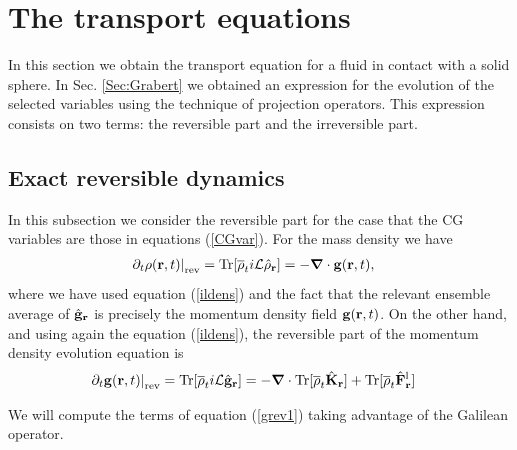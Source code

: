 \documentclass[b5paper,openright,10pt]{book}
\begin{document}
\section{The transport equations}
\label{Sec:Transequation}
In this section we obtain the transport equation for a fluid in contact with a solid sphere. In Sec. \ref{Sec:Grabert} we obtained an expression for the evolution of the selected variables using the technique of projection operators. This expression consists on two terms: the reversible part and the irreversible part. 

\subsection{Exact reversible dynamics}\label{Sec:ExactCont}
In this subsection we consider the reversible part for the case that the CG variables are those in equations (\ref{CGvar}).
For the mass density we have
\begin{align}
\left.\partial_t \rho({\bf r},t)\right|_{\rm rev}
&=  {\rm Tr}[\overline{\rho}_t  i{\cal L}\hat{\rho}_{\bf r}] 
=-\boldsymbol{\nabla}\cdot {\bf  g}({\bf r},t),
\label{conrho}
\end{align}
where we have used equation (\ref{ildens}) and the fact that the relevant
ensemble average of $\hat{\bf g}_{\bf  r}$ is precisely  the momentum
density field ${\bf g}({\bf r},t)$.  On the other hand, and using again the equation (\ref{ildens}), the reversible
part of the momentum density evolution equation is
\begin{align}
\left.\partial_t {\bf g}({\bf r},t)\right|_{\rm rev}
&=  {\rm Tr}[\overline{\rho}_t  i{\cal L}\hat{{\bf g}}_{\bf r}] 
=-\boldsymbol{\nabla}\cdot  {\rm Tr}[\overline{\rho}_t \hat{{\bf K}}_{\bf r}] 
+  {\rm Tr}[\overline{\rho}_t  \hat{\bf F}^{\rm l}_{\bf r}]
\label{grev1}
\end{align}

We will compute the terms of equation (\ref{grev1}) taking advantage of the Galilean operator. 
\end{document}
